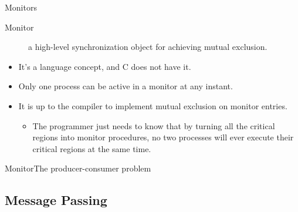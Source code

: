 \begin{frame}{Monitors}
  \begin{description}
  \item[Monitor] a high-level synchronization object for achieving mutual exclusion.
  \end{description}
  \begin{minipage}{.6\linewidth}
    \begin{itemize}
    \item It's a language concept, and C does not have it.
    \item Only one process can be active in a monitor at any instant.
    \item It is up to the compiler to implement mutual exclusion on monitor entries.
      \begin{itemize}
      \item The programmer just needs to know that by turning all the critical regions
        into monitor procedures, no two processes will ever execute their critical regions
        at the same time.
      \end{itemize}
    \end{itemize}
  \end{minipage}
  \hfill
  \begin{minipage}{.39\linewidth}
    \begin{center}
    \end{center}
  \end{minipage}
\end{frame}

\begin{frame}{Monitor}{The producer-consumer problem}
  \begin{center}
     
  \end{center}
\end{frame}

\subsection{Message Passing}
\label{sec:message-passing}  


